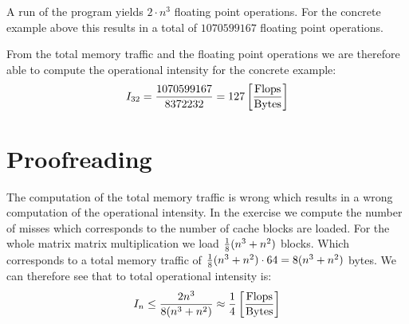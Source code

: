 \documentclass[portrait,a4paper]{article}
\begin{document}
A run of the program yields $2\cdot n^3$ floating point operations. For the concrete example above this results in a total of $1070599167$ floating point operations. 

From the total memory traffic and the floating point operations we are therefore able to compute the operational intensity for the concrete example:
\begin{align*}
    I_{32} = {1070599167\over 8372232} = 127 \left[{\text{Flops} \over \text{Bytes}}\right]
\end{align*}

\section{Proofreading}

The computation of the total memory traffic is wrong which results in a wrong computation of the operational intensity. In the exercise we compute the number of misses which corresponds to the number of cache blocks are loaded. 
For the whole matrix matrix multiplication we load ${1\over 8}(n^3+n^2)$ blocks. Which corresponds to a total memory traffic of ${1\over 8}(n^3+n^2)\cdot 64 = 8(n^3+n^2)$ bytes. We can therefore see that to total operational intensity is:
\begin{align*}
I_n \leq {2n^3 \over 8(n^3+n^2)} \approx {1\over 4}  \left[{\text{Flops} \over \text{Bytes}}\right]
\end{align*}
\end{document}
